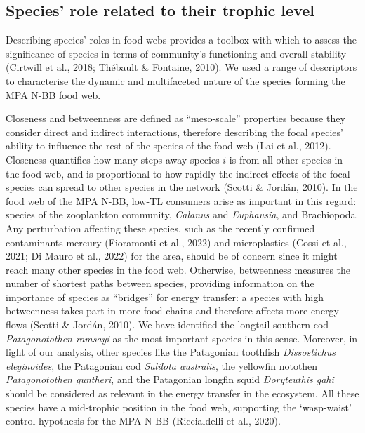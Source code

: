 \documentclass[preprint, 3p,
authoryear]{elsarticle} %
\begin{document}
\hypertarget{species-role-related-to-their-trophic-level}{%
\subsection{Species' role related to their trophic
level}\label{species-role-related-to-their-trophic-level}}

Describing species' roles in food webs provides a toolbox with which to
assess the significance of species in terms of community's functioning
and overall stability (Cirtwill et al., 2018; Thébault \& Fontaine,
2010). We used a range of descriptors to characterise the dynamic and
multifaceted nature of the species forming the MPA N-BB food web.

Closeness and betweenness are defined as ``meso-scale'' properties
because they consider direct and indirect interactions, therefore
describing the focal species' ability to influence the rest of the
species of the food web (Lai et al., 2012). Closeness quantifies how
many steps away species \(i\) is from all other species in the food web,
and is proportional to how rapidly the indirect effects of the focal
species can spread to other species in the network (Scotti \& Jordán,
2010). In the food web of the MPA N-BB, low-TL consumers arise as
important in this regard: species of the zooplankton community,
\emph{Calanus} and \emph{Euphausia}, and Brachiopoda. Any perturbation
affecting these species, such as the recently confirmed contaminants
mercury (Fioramonti et al., 2022) and microplastics (Cossi et al., 2021;
Di Mauro et al., 2022) for the area, should be of concern since it might
reach many other species in the food web. Otherwise, betweenness
measures the number of shortest paths between species, providing
information on the importance of species as ``bridges'' for energy
transfer: a species with high betweenness takes part in more food chains
and therefore affects more energy flows (Scotti \& Jordán, 2010). We
have identified the longtail southern cod \emph{Patagonotothen ramsayi}
as the most important species in this sense. Moreover, in light of our
analysis, other species like the Patagonian toothfish \emph{Dissostichus
eleginoides}, the Patagonian cod \emph{Salilota australis}, the
yellowfin notothen \emph{Patagonotothen guntheri}, and the Patagonian
longfin squid \emph{Doryteuthis gahi} should be considered as relevant
in the energy transfer in the ecosystem. All these species have a
mid-trophic position in the food web, supporting the `wasp-waist'
control hypothesis for the MPA N-BB (Riccialdelli et al., 2020).
\end{document}
